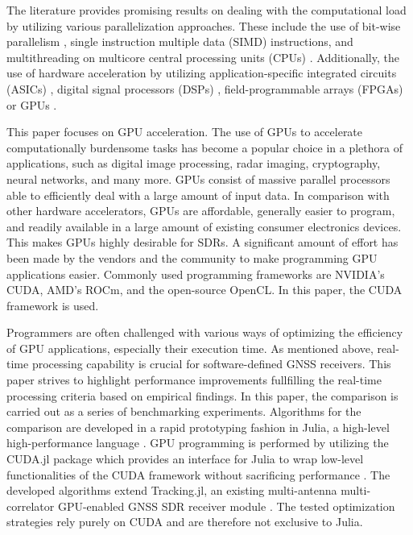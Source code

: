 \documentclass{juliacon}
\begin{document}
The literature provides promising results on dealing with the computational load by utilizing various parallelization approaches. These include the use of bit-wise parallelism \cite{Ledvina2004}, single instruction multiple data (SIMD) instructions, and multithreading on multicore central processing units (CPUs) \cite{Chen2012}. Additionally, the use of hardware acceleration by utilizing application-specific integrated circuits (ASICs) \cite{Basta2012}, digital signal processors (DSPs) \cite{Zeng2008}, field-programmable arrays (FPGAs)\cite{Cuntz2009} or GPUs \cite{Karimi2014,Park2015,Fernandez2016,Xu2017,Guo2018}.

This paper focuses on GPU acceleration. The use of GPUs to accelerate computationally burdensome tasks has become a popular choice in a plethora of applications, such as digital image processing, radar imaging, cryptography, neural networks, and many more. GPUs consist of massive parallel processors able to efficiently deal with a large amount of input data. In comparison with other hardware accelerators, GPUs are affordable, generally easier to program, and readily available in a large amount of existing consumer electronics devices. This makes GPUs highly desirable for SDRs. A significant amount of effort has been made by the vendors and the community to make programming GPU applications easier. Commonly used programming frameworks are NVIDIA's CUDA, AMD's ROCm, and the open-source OpenCL. In this paper, the CUDA framework is used.

Programmers are often challenged with various ways of optimizing the efficiency of GPU applications, especially their execution time. As mentioned above, real-time processing capability is crucial for software-defined GNSS receivers. This paper strives to highlight performance improvements fullfilling the real-time processing criteria based on empirical findings. In this paper, the comparison is carried out as a series of benchmarking experiments. Algorithms for the comparison are developed in a rapid prototyping fashion in Julia, a high-level high-performance language \cite{bezanson2017julia}. GPU programming is performed by utilizing the CUDA.jl package which provides an interface for Julia to wrap low-level functionalities of the CUDA framework without sacrificing performance \cite{Besard2018}. The developed algorithms extend Tracking.jl, an existing multi-antenna multi-correlator GPU-enabled GNSS SDR receiver module \cite{Schoenbrod2022}. The tested optimization strategies rely purely on CUDA and are therefore not exclusive to Julia.
\end{document}
